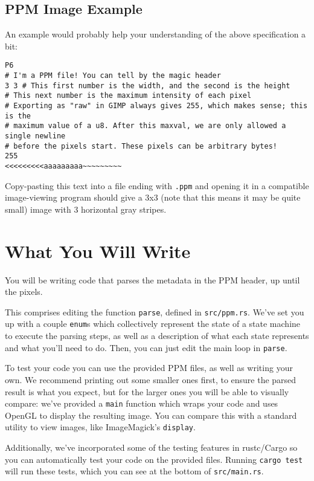 \documentclass{article}
\begin{document}
\subsection*{PPM Image Example}

An example would probably help your understanding of the above specification a bit:

\begin{verbatim}
P6
# I'm a PPM file! You can tell by the magic header
3 3 # This first number is the width, and the second is the height
# This next number is the maximum intensity of each pixel
# Exporting as "raw" in GIMP always gives 255, which makes sense; this is the
# maximum value of a u8. After this maxval, we are only allowed a single newline
# before the pixels start. These pixels can be arbitrary bytes!
255
<<<<<<<<<aaaaaaaaa~~~~~~~~~
\end{verbatim}

Copy-pasting this text into a file ending with \texttt{.ppm} and opening it in a compatible image-viewing program should give a 3x3 (note that this means it may be quite small) image with 3 horizontal gray stripes.

\section*{What You Will Write}

You will be writing code that parses the metadata in the PPM header, up until the pixels.

This comprises editing the function \texttt{parse}, defined in \texttt{src/ppm.rs}. We've set you up with a couple \texttt{enum}s which collectively represent the state of a state machine to execute the parsing steps, as well as a description of what each state represents and what you'll need to do. Then, you can just edit the main loop in \texttt{parse}.

To test your code you can use the provided PPM files, as well as writing your own. We recommend printing out some smaller ones first, to ensure the parsed result is what you expect, but for the larger ones you will be able to visually compare: we've provided a \texttt{main} function which wraps your code and uses OpenGL to display the resulting image. You can compare this with a standard utility to view images, like ImageMagick's \texttt{display}.

Additionally, we've incorporated some of the testing features in rustc/Cargo so you can automatically test your code on the provided files. Running \texttt{cargo test} will run these tests, which you can see at the bottom of \texttt{src/main.rs}.
\end{document}
